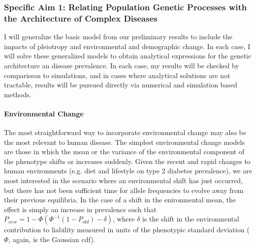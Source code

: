 \documentclass[11pt]{article}
\begin{document}
\subsubsection*{Specific Aim 1: Relating Population Genetic Processes with the Architecture of Complex Diseases}

I will generalize the basic model from our preliminary results to include the impacts of pleiotropy and environmental and demographic change. In each case, I will solve these generalized models to obtain analytical expressions for the genetic architecture an disease prevalence. In each case, my results will be checked by comparisson to simulations, and in cases where analytical solutions are not tractable, results will be pursued directly via numerical and simulation based methods.


\paragraph{Environmental Change} \qquad

The most straightforward way to incorporate environmental change may also be the most relevant to human disease. The simplest environmental change models are those in which the mean or the variance of the environmental component of the phenotype shifts or increases suddenly. Given the recent and rapid changes to human environments (e.g. diet and lifestyle on type 2 diabetes prevalence), we are most interested in the scenario where an environmental shift has just occurred, but there has not been sufficient time for allele frequencies to evolve away from their previous equilibria. In the case of a shift in the enironmental mean, the effect is simply an increase in prevalence such that $P_{new} = 1 - \Phi\left(\Phi^{-1}\left(1-P_{old}\right)-\delta\right)$, where $\delta$ is the shift in the environmental contribution to liability measured in units of the phenotypic standard deviation ($\Phi$, again, is the Gaussian cdf).
\end{document}
